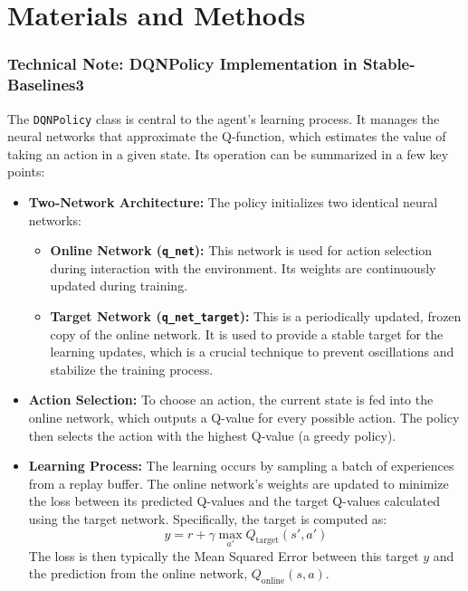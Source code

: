 \chapter{Materials and Methods}


\subsection*{Technical Note: DQNPolicy Implementation in Stable-Baselines3}

The \texttt{DQNPolicy} class is central to the agent's learning process. It manages the neural networks that approximate the Q-function, which estimates the value of taking an action in a given state. Its operation can be summarized in a few key points:

\begin{itemize}
    \item \textbf{Two-Network Architecture:} The policy initializes two identical neural networks:
    \begin{itemize}
        \item \textbf{Online Network (\texttt{q\_net}):} This network is used for action selection during interaction with the environment. Its weights are continuously updated during training.
        \item \textbf{Target Network (\texttt{q\_net\_target}):} This is a periodically updated, frozen copy of the online network. It is used to provide a stable target for the learning updates, which is a crucial technique to prevent oscillations and stabilize the training process.
    \end{itemize}

    \item \textbf{Action Selection:} To choose an action, the current state is fed into the online network, which outputs a Q-value for every possible action. The policy then selects the action with the highest Q-value (a greedy policy).

    \item \textbf{Learning Process:} The learning occurs by sampling a batch of experiences from a replay buffer. The online network's weights are updated to minimize the loss between its predicted Q-values and the target Q-values calculated using the target network. Specifically, the target is computed as:
    \[ y = r + \gamma \max_{a'} Q_{\text{target}}(s', a') \]
    The loss is then typically the Mean Squared Error between this target $y$ and the prediction from the online network, $Q_{\text{online}}(s, a)$.
\end{itemize}

